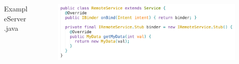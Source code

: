 \documentclass[notheorems, aspectratio=54]{beamer}
\begin{document}
\begin{frame}
	\begin{columns}
		\begin{column}{0.2\textwidth}
			\scriptsize{ExampleServer.java}
		\end{column}
		\begin{column}{0.7\textwidth}
			\begin{figure}
				\begin{flushleft}
				\includegraphics[width=\textwidth]{res/aidl-example-server.png}
				\end{flushleft}
			\end{figure}
		\end{column}
	\end{columns}
\end{frame}
\end{document}
